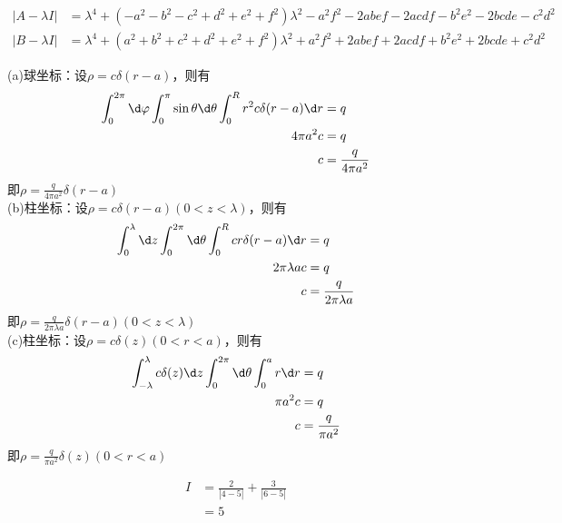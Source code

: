 \documentclass{phyasgn}
\begin{document}
\begin{sol}[5]
   \begin{align*}
    |A-\lambda I|&=\lambda ^4+ \left(-a^2-b^2-c^2+d^2+e^2+f^2\right)\lambda ^2-a^2 f^2-2 a b e f-2 a c d f-b^2 e^2-2 b c d e-c^2 d^2
   \end{align*}
   \begin{align*}
    |B-\lambda I|&=\lambda ^4+\left(a^2+b^2+c^2+d^2+e^2+f^2\right)\lambda ^2 +a^2 f^2+2 a b e f+2 a c d f+b^2 e^2+2 b c d e+c^2 d^2
   \end{align*}
\end{sol}\par

\begin{sol}[6]
    (a)球坐标：设$\rho=c\delta(r-a)$，则有
    \begin{align*}
        \int_{0}^{2\pi}\d\varphi\int_{0}^{\pi}\sin\theta\d\theta\int_{0}^{R}r^2c\delta(r-a)\d r&=q\\
        4\pi a^2c&=q\\
        c&=\frac{q}{4\pi a^2}
    \end{align*}
    即$\rho=\frac{q}{4\pi a^2}\delta(r-a)$\\
    (b)柱坐标：设$\rho=c\delta(r-a)(0<z<\lambda)$，则有
    \begin{align*}
        \int_{0}^{\lambda}\d z \int_{0}^{2\pi}\d\theta\int_{0}^{R}cr\delta(r-a)\d r&=q\\
        2\pi \lambda ac&=q\\
        c&=\frac{q}{ 2\pi \lambda a}
    \end{align*}
    即$\rho=\frac{q}{2\pi \lambda a}\delta(r-a)(0<z<\lambda)$\\
    (c)柱坐标：设$\rho=c\delta(z)(0<r<a)$，则有
    \begin{align*}
        \int_{-\lambda}^{\lambda}c\delta(z)\d z \int_{0}^{2\pi}\d\theta\int_{0}^{a}r\d r&=q\\
        \pi a^2c&=q\\
        c&=\frac{q}{\pi a^2}
    \end{align*}
    即$\rho=\frac{q}{\pi a^2}\delta(z)(0<r<a)$
 \end{sol}\par

 \begin{sol}[7]
    
    \begin{align*}
    I&=\frac{2}{|4-5|}+\frac{3}{|6-5|}\\
    &=5
    \end{align*}
    
 \end{sol}\par
 
\end{document}

